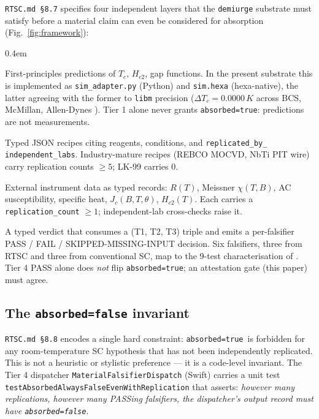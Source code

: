 \documentclass[11pt,a4paper]{article}
\newcommand{\absorbedtrue}{\textcolor{honestgreen}{\texttt{absorbed=true}}}
\newcommand{\absorbedfalse}{\textcolor{honestred}{\texttt{absorbed=false}}}
\begin{document}
\texttt{RTSC.md \S 8.7} specifies four independent layers that the
\texttt{demiurge} substrate must satisfy before a material claim can
even be considered for absorption (Fig.~\ref{fig:framework}):

\begin{description}\itemsep0.4em
\item[\textbf{Tier 1 -- Computational synthesis.}] First-principles
  predictions of \(T_{c}\), \(H_{c2}\), gap functions. In the present
  substrate this is implemented as \texttt{sim\_adapter.py} (Python)
  and \texttt{sim.hexa} (hexa-native), the latter agreeing with the
  former to \texttt{libm} precision (\(\Delta T_c = 0.0000\,K\)
  across BCS, McMillan, Allen-Dynes \cite{allen1975}).
  Tier 1 alone never grants \absorbedtrue: predictions are not
  measurements.
\item[\textbf{Tier 2 -- Synthesis-recipe-as-record.}] Typed JSON
  recipes citing reagents, conditions, and \texttt{replicated\_by\_
  independent\_labs}. Industry-mature recipes (REBCO MOCVD, NbTi
  PIT wire) carry replication counts \(\ge 5\); LK-99 carries 0.
\item[\textbf{Tier 3 -- Measurement ingest.}] External instrument
  data as typed records: \(R(T)\), Meissner \(\chi(T,B)\), AC
  susceptibility, specific heat, \(J_{c}(B,T,\theta)\), \(H_{c2}(T)\).
  Each carries a \texttt{replication\_count} \(\ge 1\); independent-lab
  cross-checks raise it.
\item[\textbf{Tier 4 -- Falsifier dispatch.}] A typed verdict that
  consumes a (T1, T2, T3) triple and emits a per-falsifier PASS / FAIL /
  SKIPPED-MISSING-INPUT decision. Six falsifiers, three from RTSC and
  three from conventional SC, map to the 9-test characterisation of
  \cite{wm2003htsmodel}. Tier 4 PASS alone does \emph{not} flip
  \absorbedtrue; an attestation gate (this paper) must agree.
\end{description}

\subsection{The \texttt{absorbed=false} invariant}
\label{sec:invariant}

\texttt{RTSC.md \S 8.8} encodes a single hard constraint:
\absorbedtrue\ is forbidden for any room-temperature SC hypothesis
that has not been independently replicated. This is not a heuristic
or stylistic preference --- it is a code-level invariant. The Tier 4
dispatcher \texttt{MaterialFalsifierDispatch} (Swift) carries a unit
test \texttt{testAbsorbedAlwaysFalseEvenWithReplication} that asserts:
\emph{however many replications, however many PASSing falsifiers, the
dispatcher's output record must have \absorbedfalse}.
\end{document}
